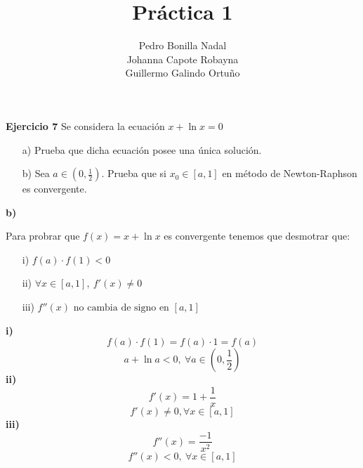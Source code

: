\documentclass[11pt]{article}
\title{\textbf{Práctica 1}}
\author{Pedro Bonilla Nadal\\
		Johanna Capote Robayna\\
		Guillermo Galindo Ortuño}
\date{}
\begin{document}
\maketitle



\textbf{Ejercicio 7}
Se considera la ecuaci\'on $x + \ln x = 0$
\begin{itemize}
\item[a)]Prueba que dicha ecuaci\'on posee una \'unica soluci\'on.
\item[b)] Sea $a \in (0, \frac{1}{2})$. Prueba que  si $x_0 \in [a,1]$ en m\'etodo de Newton-Raphson es convergente.
\end{itemize}

\textbf{b)}

Para probrar que $f(x) = x + \ln x$ es convergente tenemos que desmotrar que:
\begin{itemize}
\item[i)]$f(a) \cdot f(1) < 0$
\item[ii)]$\forall x \in [a,1], \ f'(x) \neq 0 $
\item[iii)]$f''(x) \text{ no cambia de signo en } [a,1] $
\end{itemize}

\textbf{i)}
$$f(a) \cdot f(1) = f(a) \cdot 1 = f(a) $$
$$a + \ln a < 0 , \  \forall a \in (0, \frac{1}{2}) $$
\textbf{ii)}
$$f'(x) = 1 + \frac{1}{x} $$
$$f'(x) \neq 0 , \forall x \in [a,1] $$
\textbf{iii)}
$$f''(x) = \frac{-1}{x^2} $$
$$f''(x) < 0 , \ \forall x \in [a,1] $$
\end{document}

